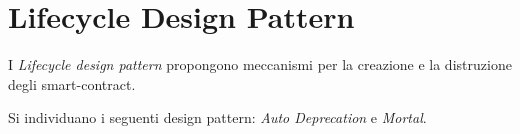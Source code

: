 {{\begin{table}[H]
		\caption{Specifiche Tight Variable Packing Pattern}
	\end{table}
}
}

{\section{Lifecycle Design Pattern}
	I \textit{Lifecycle design pattern} propongono meccanismi per la creazione e la distruzione degli smart-contract. \par
	Si individuano i seguenti design pattern: \textit{Auto Deprecation} e \textit{Mortal}.
	
}
